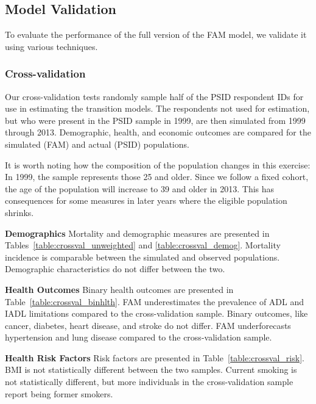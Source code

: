 \subsection{Model Validation}
\label{appendix:health-validation}
\noindent To evaluate the performance of the full version of the FAM model, we validate it using various techniques.

\subsubsection{Cross-validation}
\noindent Our cross-validation tests randomly sample half of the PSID respondent IDs for use in estimating the transition models. The respondents not used for estimation, but who were present in the PSID sample in 1999, are then simulated from 1999 through 2013. Demographic, health, and economic outcomes are compared for the simulated (FAM) and actual (PSID) populations.

\noindent It is worth noting how the composition of the population changes in this exercise: In 1999, the sample represents those 25 and older. Since we follow a fixed cohort, the age of the population will increase to 39 and older in 2013. This has consequences for some measures in later years where the eligible population shrinks.

\noindent\textbf{Demographics}
Mortality and demographic measures are presented in Tables~\ref{table:crossval_unweighted} and \ref{table:crossval_demog}. Mortality incidence is comparable between the simulated and observed populations. Demographic characteristics do not differ between the two.

\noindent\textbf{Health Outcomes}
Binary health outcomes are presented in Table~\ref{table:crossval_binhlth}. FAM underestimates the prevalence of ADL and IADL limitations compared to the cross-validation sample. Binary outcomes, like cancer, diabetes, heart disease, and stroke do not differ. FAM underforecasts hypertension and lung disease compared to the cross-validation sample.

\noindent\textbf{Health Risk Factors}
Risk factors are presented in Table~\ref{table:crossval_risk}. BMI is not statistically different between the two samples. Current smoking is not statistically different, but more individuals in the cross-validation sample report being former smokers.

